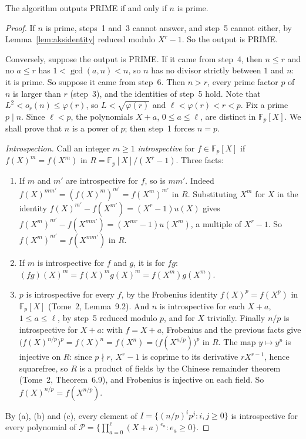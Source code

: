 \begin{theorem}\label{thm:aks}
The algorithm outputs \textup{PRIME} if and only if $n$ is prime.
\end{theorem}
\begin{proof}
If $n$ is prime, steps~1 and~3 cannot answer, and step~5 cannot either, by Lemma~\ref{lem:aksidentity} reduced modulo $X^r-1$. So the output is \textup{PRIME}.

Conversely, suppose the output is \textup{PRIME}. If it came from step~4, then $n\le r$ and no $a\le r$ has $1<\gcd(a,n)<n$, so $n$ has no divisor strictly between $1$ and $n$: it is prime. So suppose it came from step~6. Then $n>r$, every prime factor $p$ of $n$ is larger than $r$ (step~3), and the identities of step~5 hold. Note that $L^2<o_r(n)\le\varphi(r)$, so $L<\sqrt{\varphi(r)}$ and $\ell<\varphi(r)<r<p$. Fix a prime $p\mid n$. Since $\ell<p$, the polynomials $X+a$, $0\le a\le\ell$, are distinct in $\mathbb F_p[X]$.
We shall prove that $n$ is a power of $p$; then step~1 forces $n=p$.

\emph{Introspection.} Call an integer $m\ge1$ \emph{introspective} for $f\in\mathbb F_p[X]$ if $f(X)^m=f(X^m)$ in $R=\mathbb F_p[X]/(X^r-1)$. Three facts:
\begin{enumerate}
\item[(a)] If $m$ and $m'$ are introspective for $f$, so is $mm'$. Indeed $f(X)^{mm'}=(f(X)^m)^{m'}=f(X^m)^{m'}$ in $R$. Substituting $X^m$ for $X$ in the identity $f(X)^{m'}-f(X^{m'})=(X^r-1)u(X)$ gives $f(X^m)^{m'}-f(X^{mm'})=(X^{mr}-1)u(X^m)$, a multiple of $X^r-1$. So $f(X^m)^{m'}=f(X^{mm'})$ in $R$.
\item[(b)] If $m$ is introspective for $f$ and $g$, it is for $fg$: $(fg)(X)^m=f(X)^mg(X)^m=f(X^m)g(X^m)$.
\item[(c)] $p$ is introspective for every $f$, by the Frobenius identity $f(X)^p=f(X^p)$ in $\mathbb F_p[X]$ (Tome~2, Lemma~9.2). And $n$ is introspective for each $X+a$, $1\le a\le\ell$, by step~5 reduced modulo $p$, and for $X$ trivially. Finally $n/p$ is introspective for $X+a$: with $f=X+a$, Frobenius and the previous facts give
$\bigl(f(X)^{n/p}\bigr)^p=f(X)^n=f(X^n)=\bigl(f(X^{n/p})\bigr)^p$ in $R$. The map $y\mapsto y^p$ is injective on $R$: since $p\nmid r$, $X^r-1$ is coprime to its derivative $rX^{r-1}$, hence squarefree, so $R$ is a product of fields by the Chinese remainder theorem (Tome~2, Theorem~6.9), and Frobenius is injective on each field. So $f(X)^{n/p}=f(X^{n/p})$.
\end{enumerate}
By (a), (b) and (c), every element of $I=\{(n/p)^ip^j:i,j\ge0\}$ is introspective for every polynomial of $\mathcal P=\bigl\{\prod_{a=0}^\ell(X+a)^{e_a}:e_a\ge0\bigr\}$.


\end{proof}
